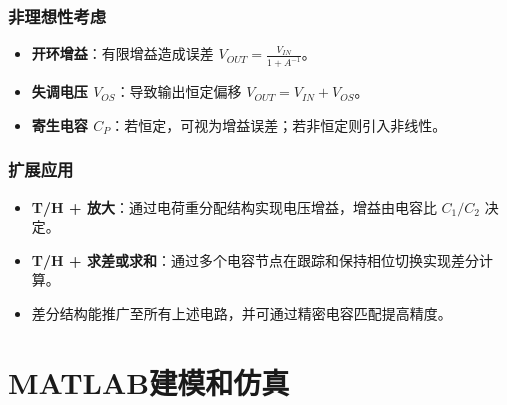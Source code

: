 \documentclass[cs4size,a4paper]{ctexart}
\numberwithin{equation}{section}
\numberwithin{table}{section}
\numberwithin{figure}{section}
\begin{document}
			\subsubsection{非理想性考虑}
			\begin{itemize}
				\item \textbf{开环增益}：有限增益造成误差 $V_{OUT} = \frac{V_{IN}}{1 + A^{-1}}$。
				\item \textbf{失调电压 $V_{OS}$}：导致输出恒定偏移 $V_{OUT} = V_{IN} + V_{OS}$。
				\item \textbf{寄生电容 $C_P$}：若恒定，可视为增益误差；若非恒定则引入非线性。
			\end{itemize}
			
			\subsubsection{扩展应用}
			\begin{itemize}
				\item \textbf{T/H + 放大}：通过电荷重分配结构实现电压增益，增益由电容比 $C_1/C_2$ 决定。
				\item \textbf{T/H + 求差或求和}：通过多个电容节点在跟踪和保持相位切换实现差分计算。
				\item 差分结构能推广至所有上述电路，并可通过精密电容匹配提高精度。
			\end{itemize}
			
\newpage		
\section{MATLAB建模和仿真}
\end{document}
